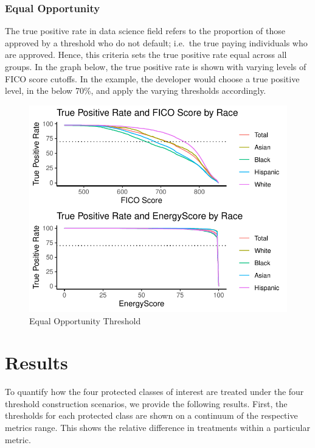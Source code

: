 \documentclass[11pt,]{article}
\begin{document}
\hypertarget{equal-opportunity}{%
\subsubsection{Equal Opportunity}\label{equal-opportunity}}

The true positive rate in data science field refers to the proportion of
those approved by a threshold who do not default; i.e.~the true paying
individuals who are approved. Hence, this criteria sets the true
positive rate equal across all groups. In the graph below, the true
positive rate is shown with varying levels of FICO score cutoffs. In the
example, the developer would choose a true positive level, in the below
70\%, and apply the varying thresholds accordingly.

\begin{figure}
\centering
\includegraphics{figs/equalop.pdf}
\caption{\label{fig:equalop}Equal Opportunity Threshold}
\end{figure}

\hypertarget{results}{%
\section{Results}\label{results}}

To quantify how the four protected classes of interest are treated under
the four threshold construction scenarios, we provide the following
results. First, the thresholds for each protected class are shown on a
continuum of the respective metrics range. This shows the relative
difference in treatments within a particular metric.
\end{document}
